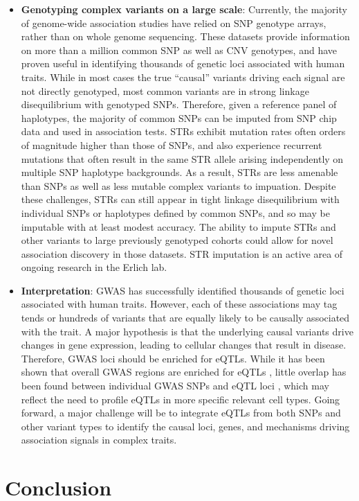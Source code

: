 \begin{itemize}
\item \textbf{Genotyping complex variants on a large scale}: Currently, the majority of genome-wide association studies have relied on SNP genotype arrays, rather than on whole genome sequencing. These datasets provide information on more than a million common SNP as well as CNV genotypes, and have proven useful in identifying thousands of genetic loci associated with human traits. While in most cases the true ``causal'' variants driving each signal are not directly genotyped, most common variants are in strong linkage disequilibrium with genotyped SNPs. Therefore, given a reference panel of haplotypes, the majority of common SNPs can be imputed from SNP chip data and used in association tests. STRs exhibit mutation rates often orders of magnitude higher than those of SNPs, and also experience recurrent mutations that often result in the same STR allele arising independently on multiple SNP haplotype backgrounds. As a result, STRs are less amenable than SNPs as well as less mutable complex variants to impuation. 
Despite these challenges, STRs can still appear in tight linkage disequilibrium with individual SNPs or haplotypes defined by common SNPs, and so may be imputable with at least modest accuracy. The ability to impute STRs and other variants to large previously genotyped cohorts could allow for novel association discovery in those datasets. STR imputation is an active area of ongoing research in the Erlich lab.

\item \textbf{Interpretation}: GWAS has successfully identified thousands of genetic loci associated with human traits. However, each of these associations may tag tends or hundreds of variants that are equally likely to be causally associated with the trait. A major hypothesis is that the underlying causal variants drive changes in gene expression, leading to cellular changes that result in disease. Therefore, GWAS loci should be enriched for eQTLs. While it has been shown that overall GWAS regions are enriched for eQTLs \cite{NicolaeGamazonZhangEtAl2010}, little overlap has been found between individual GWAS SNPs and eQTL loci \cite{HuangFangJostinsEtAl2015}, which may reflect the need to profile eQTLs in more specific relevant cell types. Going forward, a major challenge will be to integrate eQTLs from both SNPs and other variant types to identify the causal loci, genes, and mechanisms driving association signals in complex traits.

\end{itemize}

\section{Conclusion} %
